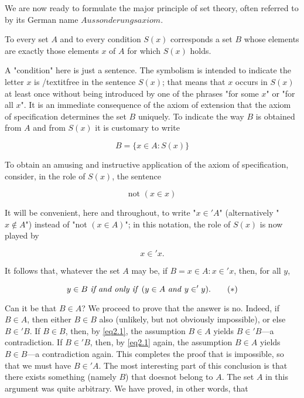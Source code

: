 We are now ready to formulate the major principle of set theory, often referred to by its German name $Aussonderungsaxiom$. 

\begin{named} To every set $A$ and to every condition $S(x)$ corresponds a set $B$ whose elements are exactly those elements $x$ of $A$ for which $S(x)$ holds.
\end{named}

A "condition" here is just a sentence. The symbolism is intended to indicate the letter $x$ is /textit{free} in the sentence $S(x)$; that means that $x$ occurs in $S(x)$ at least once without being introduced by one of the phrases "for some $x$" or "for all $x$". It is an immediate consequence of the axiom of extension that the axiom of specification determines the set $B$ uniquely. To indicate the way $B$ is obtained from $A$ and from $S(x)$ it is customary to write 

\begin{equation*}
B  = \{ x \in A: S(x) \} 
\end{equation*}

To obtain an amusing and instructive application of the axiom of specification, consider, in the role of $S(x)$, the sentence

\begin{equation*}
\text{not } (x \in x)
\end{equation*}

It will be convenient, here and throughout, to write "$x \in '  A$" (alternatively "$ x \notin A $") instead of "not $(x \in A)$"; in this notation, the role of $S(x)$ is now played by

\begin{equation*}
x \in ' x.
\end{equation*}

It follows that, whatever the set $A$ may be, if $B = {x \in A: x \in ' x}$, then, for all $y$,

\begin{equation}
\label{eq2.1}
y \in B \text{ \textit{if and only if }} ( y \in A \text{ \textit{and} } y \in ' y). \tag{$\ast$}
\end{equation}

Can it be that $B \in A$? We proceed to prove that the answer is no. Indeed, if $B \in A$, then either $B \in B$ also (unlikely, but not obviously impossible), or else $B \in ' B$. If $B \in B$, then, by \eqref{eq2.1}, the assumption $B \in A$ yields $B \in ' B$—a contradiction. If $B \in ' B$, then, by \eqref{eq2.1} again, the assumption $B \in A$ yields $B \in B$—a contradiction again. This completes the proof that is impossible, so that we must have $B \in ' A$. The most interesting part of this conclusion is that there exists something (namely $B$) that doesnot belong to $A$. The set $A$ in this argument was quite arbitrary. We have proved, in other words, that 

